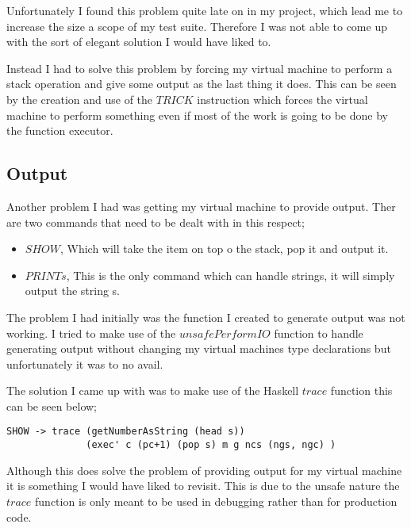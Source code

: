 Unfortunately I found this problem quite late on in my project, which lead me to increase the size a scope of my test suite. Therefore I was not able to come up with the sort of elegant solution I would have liked to. 

Instead I had to solve this problem by forcing my virtual machine to perform a stack operation and give some output as the last thing it does. This can be seen by the creation and use of the $TRICK$ instruction which forces the virtual machine to perform something even if most of the work is going to be done by the function executor. 

\subsection{Output}

Another problem I had was getting my virtual machine to provide output. Ther are two commands that need to be dealt with in this respect;

\begin{itemize}
\item $SHOW$, Which will take the item on top o the stack, pop it and output it.
\item $PRINT s$, This is the only command which can handle strings, it will simply output the string s.
\end{itemize}

The problem I had initially was the function I created to generate output was not working. I tried to make use of the $unsafePerformIO$ function to handle generating output without changing my virtual machines type declarations but unfortunately it was to no avail. 

\newpage

The solution I came up with was to make use of the Haskell $trace$ function this can be seen below;

\begin{lstlisting}
SHOW -> trace (getNumberAsString (head s)) 
              (exec' c (pc+1) (pop s) m g ncs (ngs, ngc) ) 
\end{lstlisting}  

Although this does solve the problem of providing output for my virtual machine it is something I would have liked to revisit. This is due to the unsafe nature the $trace$ function is only meant to be used in debugging rather than for production code.
